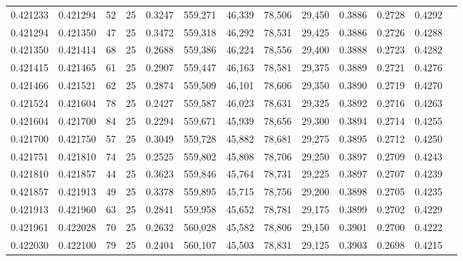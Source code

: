 \begin{tabular}{rrrrrrrrrrrrr}
0.421233 & 0.421294 &    52 &  25 &                                     0.3247 & 559,271 &  46,339 &  78,506 &  29,450 & 0.3886 & 0.2728 & 0.4292 \\
0.421294 & 0.421350 &    47 &  25 &                                     0.3472 & 559,318 &  46,292 &  78,531 &  29,425 & 0.3886 & 0.2726 & 0.4288 \\
0.421350 & 0.421414 &    68 &  25 &                                     0.2688 & 559,386 &  46,224 &  78,556 &  29,400 & 0.3888 & 0.2723 & 0.4282 \\
0.421415 & 0.421465 &    61 &  25 &                                     0.2907 & 559,447 &  46,163 &  78,581 &  29,375 & 0.3889 & 0.2721 & 0.4276 \\
0.421466 & 0.421521 &    62 &  25 &                                     0.2874 & 559,509 &  46,101 &  78,606 &  29,350 & 0.3890 & 0.2719 & 0.4270 \\
0.421524 & 0.421604 &    78 &  25 &                                     0.2427 & 559,587 &  46,023 &  78,631 &  29,325 & 0.3892 & 0.2716 & 0.4263 \\
0.421604 & 0.421700 &    84 &  25 &                                     0.2294 & 559,671 &  45,939 &  78,656 &  29,300 & 0.3894 & 0.2714 & 0.4255 \\
0.421700 & 0.421750 &    57 &  25 &                                     0.3049 & 559,728 &  45,882 &  78,681 &  29,275 & 0.3895 & 0.2712 & 0.4250 \\
0.421751 & 0.421810 &    74 &  25 &                                     0.2525 & 559,802 &  45,808 &  78,706 &  29,250 & 0.3897 & 0.2709 & 0.4243 \\
0.421810 & 0.421857 &    44 &  25 &                                     0.3623 & 559,846 &  45,764 &  78,731 &  29,225 & 0.3897 & 0.2707 & 0.4239 \\
0.421857 & 0.421913 &    49 &  25 &                                     0.3378 & 559,895 &  45,715 &  78,756 &  29,200 & 0.3898 & 0.2705 & 0.4235 \\
0.421913 & 0.421960 &    63 &  25 &                                     0.2841 & 559,958 &  45,652 &  78,781 &  29,175 & 0.3899 & 0.2702 & 0.4229 \\
0.421961 & 0.422028 &    70 &  25 &                                     0.2632 & 560,028 &  45,582 &  78,806 &  29,150 & 0.3901 & 0.2700 & 0.4222 \\
0.422030 & 0.422100 &    79 &  25 &                                     0.2404 & 560,107 &  45,503 &  78,831 &  29,125 & 0.3903 & 0.2698 & 0.4215 \\

\end{tabular}

